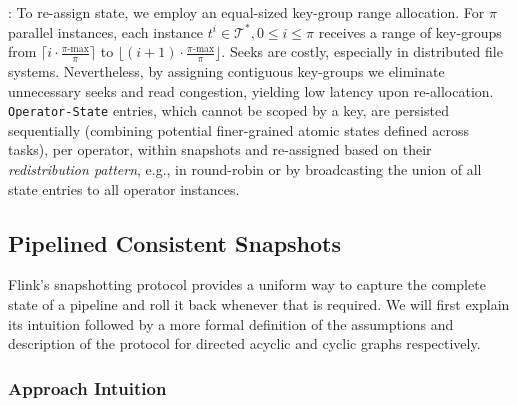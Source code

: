 : To re-assign state, we employ an equal-sized  key-group range allocation. For $\pi$ parallel instances, each instance $t^i \in \mathcal{T^*}, 0\leq i \leq \pi$ receives a range of key-groups from $\lceil i \cdot \frac{\pi\text{-max}}{\pi} \rceil$ to $\lfloor (i+1) \cdot \frac{\pi\text{-max}}{\pi} \rfloor$. Seeks are costly, especially in distributed file systems. Nevertheless, by assigning contiguous key-groups we eliminate unnecessary seeks and read congestion, yielding low latency upon re-allocation. 
\texttt{Operator-State} entries, which cannot be scoped by a key, are persisted sequentially (combining potential finer-grained atomic states defined across tasks), per operator, within snapshots and re-assigned based on their \emph{redistribution pattern}, e.g., in round-robin or by broadcasting the union of all state entries to all operator instances.


\subsection{Pipelined Consistent Snapshots}
\label{sec:snapshots}

Flink's snapshotting protocol provides a uniform way to capture the complete state of a pipeline and roll it back whenever that is required. We will first explain its intuition followed by a more formal definition of the assumptions and description of the protocol for directed acyclic and cyclic graphs respectively.


\subsubsection{Approach Intuition}


